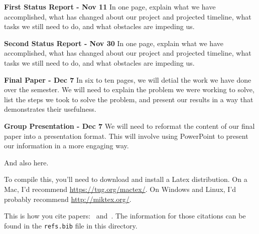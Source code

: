 \documentclass[12pt]{article}
\begin{document}
\textbf{First Status Report - Nov 11}
In one page, explain what we have accomplished, what has changed about our project
and projected timeline, what tasks we still need to do, and what obstacles
are impeding us.

\textbf{Second Status Report - Nov 30}
In one page, explain what we have accomplished, what has changed about our project
and projected timeline, what tasks we still need to do, and what obstacles
are impeding us.

\textbf{Final Paper - Dec 7}
In six to ten pages, we will detial the work we have done over the semester. We
will need to explain the problem we were working to solve, list the steps
we took to solve the problem, and present our results in a way that 
demonstrates their usefulness.

\textbf{Group Presentation - Dec 7}
We will need to reformat the content of our final paper into a presentation
format. This will involve using PowerPoint to present our information in
a more engaging way.




And also here.

To compile this, you'll need to download and install a Latex distribution.  On a Mac, I'd recommend \url{https://tug.org/mactex/}.  On Windows and Linux, I'd probably recommend \url{http://miktex.org/}.

This is how you cite papers:~\cite{Othman13:Gates} and~\cite{Pennock01:Real}.  The information for those citations can be found in the \texttt{refs.bib} file in this directory.



\end{document}
